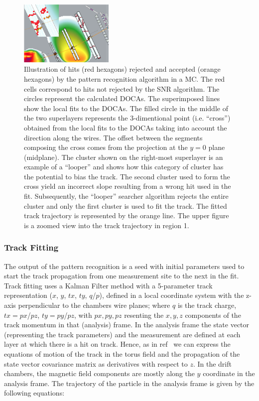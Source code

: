 \begin{figure}
\centering
\includegraphics[width=0.4\textwidth]{pics/dcPattern13.png}
\caption{
Illustration of hits (red hexagons) rejected and accepted (orange hexagons) by the pattern recognition algorithm in a MC.  
The red cells correspond to hits not rejected by the SNR algorithm.  The circles represent the calculated DOCAs.  The superimposed lines show the local fits to the DOCAs.  The filled circle in the middle of the two superlayers represents the 3-dimentional point (i.e. ``cross'') obtained from the local fits to the DOCAs taking into account the direction along the wires.
The offset between the segments composing the cross comes from the projection at the $y=0$ plane (midplane).
The cluster shown on the right-most superlayer is an example of a ``looper'' and shows how this category of cluster has the potential to bias the track.  The second cluster used to form the cross yield an incorrect slope resulting from a wrong hit used in the fit.  Subsequently, the ``looper'' searcher algorithm rejects the entire cluster and only the first cluster is used to fit the track.  The fitted track trajectory is represented by the orange line. 
The upper figure is a zoomed view into the track trajectory in region 1.
}
\label{fig:dcsegs}
\end{figure}


\subsubsection{Track Fitting}
The output of the pattern recognition
is a seed with initial parameters used to start the track propagation from one measurement site to the next in the fit.
Track fitting uses a Kalman Filter method with a 5-parameter track representation ($x$, $y$, $tx$, $ty$, $q$/$p$), defined
in a local coordinate system with the z-axis perpendicular to the chambers wire planes; where $q$ is the
track charge, $tx=px$/$pz$,
$ty=py$/$pz$, with $px,py,pz$ resenting the $x,y,z$ components of the track momentum in that (analysis) frame.
In the analysis frame the state vector (representing the track parameters) and the measurement are defined at each layer
at which there is a hit on track.
Hence, as in ref~\cite{spiri} we can express the equations of motion of the track in the torus field
and the propagation of the state vector covariance matrix as derivatives with respect to $z$.
In the drift chambers, the magnetic field components are mostly along the $y$ coordinate in the analysis frame.
The trajectory of the particle in the analysis frame is given by the following equations:


